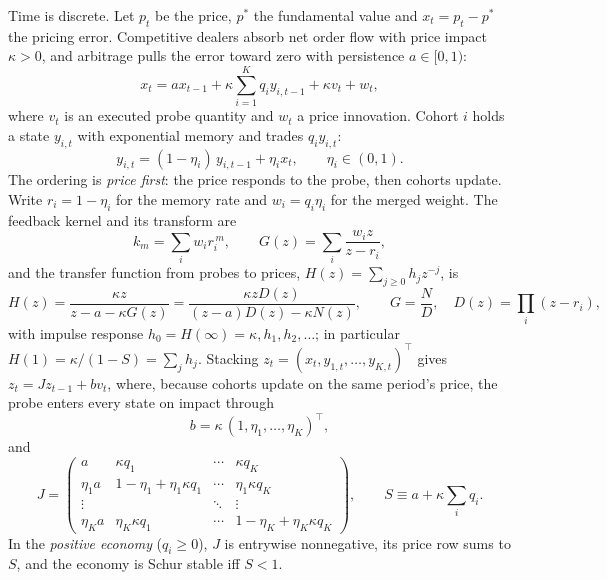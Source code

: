 Time is discrete. Let $p_t$ be the price, $p^*$ the fundamental value and $x_t=p_t-p^*$ the pricing error. Competitive dealers absorb net order flow with price impact $\kappa>0$, and arbitrage pulls the error toward zero with persistence $a\in[0,1)$:
\begin{equation}\label{p1:eq:price}
x_t = a x_{t-1} + \kappa \sum_{i=1}^K q_i y_{i,t-1} + \kappa v_t + w_t,
\end{equation}
where $v_t$ is an executed probe quantity and $w_t$ a price innovation. Cohort $i$ holds a state $y_{i,t}$ with exponential memory and trades $q_i y_{i,t}$:
\begin{equation}\label{p1:eq:cohort}
y_{i,t} = (1-\eta_i)\,y_{i,t-1} + \eta_i x_t,\qquad \eta_i\in(0,1).
\end{equation}
The ordering is \emph{price first}: the price responds to the probe, then cohorts update. Write $r_i=1-\eta_i$ for the memory rate and $w_i=q_i\eta_i$ for the merged weight. The feedback kernel and its transform are
\begin{equation}\label{p1:eq:kernel}
k_m=\sum_i w_i r_i^{\,m},\qquad G(z)=\sum_i \frac{w_i z}{z-r_i},
\end{equation}
and the transfer function from probes to prices, $H(z)=\sum_{j\ge0}h_jz^{-j}$, is
\begin{equation}\label{p1:eq:H}
H(z)=\frac{\kappa z}{z-a-\kappa G(z)}=\frac{\kappa zD(z)}{(z-a)D(z)-\kappa N(z)},\qquad G=\frac ND,\quad D(z)=\prod_{i}(z-r_i),
\end{equation}
with impulse response $h_0=H(\infty)=\kappa,h_1,h_2,\ldots$; in particular $H(1)=\kappa/(1-S)=\sum_jh_j$. Stacking $z_t=(x_t,y_{1,t},\ldots,y_{K,t})^\top$ gives $z_t=Jz_{t-1}+bv_t$, where, because cohorts update on the same period's price, the probe enters every state on impact through
\begin{equation}\label{p1:eq:b}
b=\kappa\,(1,\eta_1,\ldots,\eta_K)^\top ,
\end{equation}
and
\begin{equation}\label{p1:eq:J}
J=\begin{pmatrix} a & \kappa q_1 & \cdots & \kappa q_K\\ \eta_1 a & 1-\eta_1+\eta_1\kappa q_1 & \cdots & \eta_1\kappa q_K\\ \vdots & & \ddots & \vdots\\ \eta_K a & \eta_K\kappa q_1 & \cdots & 1-\eta_K+\eta_K\kappa q_K\end{pmatrix},\qquad S\equiv a+\kappa\sum_i q_i .
\end{equation}
In the \emph{positive economy} ($q_i\ge0$), $J$ is entrywise nonnegative, its price row sums to $S$, and the economy is Schur stable iff $S<1$.


